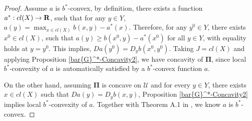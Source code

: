 \begin{proof}
	Assume $a$ is $b^*$-convex, by definition, there exists a function  $a^*: cl(X) \rightarrow {\mathbf R}$, such that for any $y\in Y$, $a(y) = \max_{x\in cl(X)} b(x,y) - a^*(x)$. Therefore, for any $y^0 \in Y$, there exists $x^0 \in cl(X)$, such that $a(y) \ge b(x^0,y) - a^*(x^0)$ for all $y \in Y$, with equality holds at $y = y^0$. This implies, $Da(y^0) = D_y b(x^0, y^0)$. Taking $J=cl(X)$ and applying Proposition \ref{bar{G}^*-Concavity2}, we have concavity of $\mathbf \Pi$, since local $b^*$-convexity of $a$ is automatically satisfied by a $b^*$-convex function $a$. 
	
	On the other hand, assuming $\mathbf \Pi$ is concave on $\mathcal U$ and for every $y \in Y$, there exists $x \in cl(X)$ such that $Da(y) = D_y b(x,y)$, Proposition \ref{bar{G}^*-Concavity2} implies local $b^*$-convexity of $a$. Together with Theorem A.1 in \cite{KimMcCann10}, we know $a$ is $b^*$-convex.
\end{proof}


































